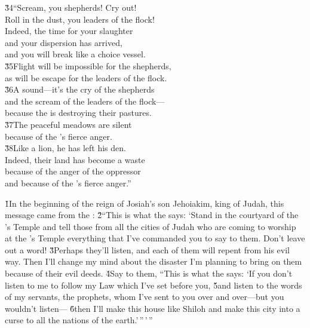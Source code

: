 \begin{poetry}
\poeml \v{34}``Scream, you shepherds! Cry out! \\
\poemll    Roll in the dust, you leaders of the flock! \\
\poeml Indeed, the time for your slaughter \\
\poemll    and your dispersion has arrived, \\
\poemlll       and you will break like a choice vessel. \\
\poeml \v{35}Flight will be impossible for the shepherds, \\
\poemll    as will be escape for the leaders of the flock. \\
\poeml \v{36}A sound---it's the cry of the shepherds \\
\poemll    and the scream of the leaders of the flock--- \\
\poemlll       because the  is destroying their pastures. \\
\poeml \v{37}The peaceful meadows are silent \\
\poemll    because of the 's fierce anger. \\
\poeml \v{38}Like a lion, he has left his den. \\
\poemll    Indeed, their land has become a waste \\
\poeml because of the anger of the oppressor \\
\poemll    and because of the 's fierce anger.''
\end{poetry}

\v{1}In the beginning of the reign of Josiah's son Jehoiakim, king of Judah, this message came from the : \v{2}``This is what the  says: `Stand in the courtyard of the 's Temple and tell those from all the cities of Judah who are coming to worship at the 's Temple everything that I've commanded you to say to them. Don't leave out a word! \v{3}Perhaps they'll listen, and each of them will repent from his evil way. Then I'll change my mind about the disaster I'm planning to bring on them because of their evil deeds. \v{4}Say to them, ``This is what the  says: `If you don't listen to me to follow my Law which I've set before you, \v{5}and listen to the words of my servants, the prophets, whom I've sent to you over and over---but you wouldn't listen--- \v{6}then I'll make this house like Shiloh and make this city into a curse to all the nations of the earth.'\,''\,'\,''

